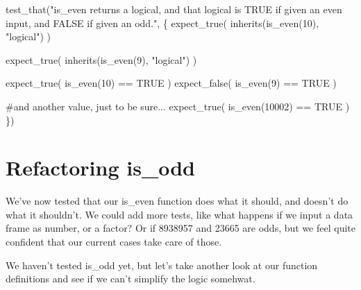 \documentclass[
  letterpaper,
  DIV=11,
  numbers=noendperiod]{scrreprt}
\newenvironment{Shaded}{\begin{snugshade}}{\end{snugshade}}
\newcommand{\CommentTok}[1]{\textcolor[rgb]{0.37,0.37,0.37}{#1}}
\newcommand{\ConstantTok}[1]{\textcolor[rgb]{0.56,0.35,0.01}{#1}}
\newcommand{\DecValTok}[1]{\textcolor[rgb]{0.68,0.00,0.00}{#1}}
\newcommand{\FunctionTok}[1]{\textcolor[rgb]{0.28,0.35,0.67}{#1}}
\newcommand{\NormalTok}[1]{\textcolor[rgb]{0.00,0.23,0.31}{#1}}
\newcommand{\SpecialCharTok}[1]{\textcolor[rgb]{0.37,0.37,0.37}{#1}}
\newcommand{\StringTok}[1]{\textcolor[rgb]{0.13,0.47,0.30}{#1}}
\begin{document}
\begin{Shaded}
\begin{Highlighting}[]
\FunctionTok{test\_that}\NormalTok{(}\StringTok{"is\_even returns a logical, and that logical is TRUE if given an even input, and FALSE if given an odd."}\NormalTok{, \{}
  \FunctionTok{expect\_true}\NormalTok{(}
    \FunctionTok{inherits}\NormalTok{(}\FunctionTok{is\_even}\NormalTok{(}\DecValTok{10}\NormalTok{), }\StringTok{"logical"}\NormalTok{)}
\NormalTok{  )}
  
  \FunctionTok{expect\_true}\NormalTok{(}
    \FunctionTok{inherits}\NormalTok{(}\FunctionTok{is\_even}\NormalTok{(}\DecValTok{9}\NormalTok{), }\StringTok{"logical"}\NormalTok{)}
\NormalTok{  )}
  
  \FunctionTok{expect\_true}\NormalTok{(}
    \FunctionTok{is\_even}\NormalTok{(}\DecValTok{10}\NormalTok{) }\SpecialCharTok{==} \ConstantTok{TRUE}
\NormalTok{  )}
  \FunctionTok{expect\_false}\NormalTok{(}
    \FunctionTok{is\_even}\NormalTok{(}\DecValTok{9}\NormalTok{) }\SpecialCharTok{==} \ConstantTok{TRUE}
\NormalTok{    )}
  
  \CommentTok{\#and another value, just to be sure...}
  \FunctionTok{expect\_true}\NormalTok{(}
    \FunctionTok{is\_even}\NormalTok{(}\DecValTok{10002}\NormalTok{) }\SpecialCharTok{==} \ConstantTok{TRUE}
\NormalTok{  )}
\NormalTok{\})}
\end{Highlighting}
\end{Shaded}

\section{Refactoring is\_odd}\label{refactoring-is_odd}

We've now tested that our is\_even function does what it should, and
doesn't do what it shouldn't. We could add more tests, like what happens
if we input a data frame as number, or a factor? Or if 8938957 and 23665
are odds, but we feel quite confident that our current cases take care
of those.

We haven't tested is\_odd yet, but let's take another look at our
function definitions and see if we can't simplify the logic somehwat.
\end{document}
